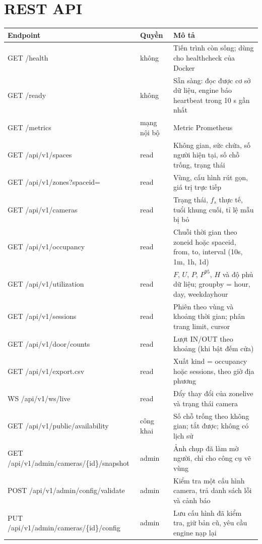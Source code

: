 \documentclass[10pt,a4paper,oneside,openany]{report}
\newcommand{\breakus}{\textunderscore\allowbreak}
\newcommand{\code}[1]{{\ttfamily\let\_\breakus #1}}
\newcommand{\tabhead}[1]{\textsf{\bfseries\color{ink}#1}}
\newenvironment{bang}{\par\small\rowcolors{2}{rowgray}{white}}{\par\vspace{0.3em}}
\begin{document}
\section{REST API}\label{sec:api}
\begin{bang}
\begin{xltabular}{\linewidth}{L{62mm}L{14mm}Y}
\toprule
\tabhead{Endpoint} & \tabhead{Quyền} & \tabhead{Mô tả} \\
\midrule
\endhead
\code{GET /health} & không & Tiến trình còn sống; dùng cho healthcheck của Docker \\
\code{GET /ready} & không & Sẵn sàng: đọc được cơ sở dữ liệu, engine báo heartbeat trong 10 s gần nhất \\
\code{GET /metrics} & mạng nội bộ & Metric Prometheus \\
\code{GET /api/v1/spaces} & read & Không gian, sức chứa, số người hiện tại, số chỗ trống, trạng thái \\
\code{GET /api/v1/zones?space\_id=} & read & Vùng, cấu hình rút gọn, giá trị trực tiếp \\
\code{GET /api/v1/cameras} & read & Trạng thái, $f_s$ thực tế, tuổi khung cuối, tỉ lệ mẫu bị bỏ \\
\code{GET /api/v1/occupancy} & read & Chuỗi thời gian theo \code{zone\_id} hoặc \code{space\_id}, \code{from}, \code{to}, \code{interval} (10s, 1m, 1h, 1d) \\
\code{GET /api/v1/utilization} & read & $F$, $U$, $P$, $P^{95}$, $H$ và độ phủ dữ liệu; \code{group\_by} = \code{hour}, \code{day}, \code{weekday\_hour} \\
\code{GET /api/v1/sessions} & read & Phiên theo vùng và khoảng thời gian; phân trang \code{limit}, \code{cursor} \\
\code{GET /api/v1/door/counts} & read & Lượt IN/OUT theo khoảng (khi bật đếm cửa) \\
\code{GET /api/v1/export.csv} & read & Xuất \code{kind} = \code{occupancy} hoặc \code{sessions}, theo giờ địa phương \\
\code{WS /api/v1/ws/live} & read & Đẩy thay đổi của \code{zone\_live} và trạng thái camera \\
\code{GET /api/v1/public/availability} & công khai & Số chỗ trống theo không gian; tắt được; không có lịch sử \\
\code{GET /api/v1/admin/cameras/\{id\}/snapshot} & admin & Ảnh chụp đã làm mờ người, chỉ cho công cụ vẽ vùng \\
\code{POST /api/v1/admin/config/validate} & admin & Kiểm tra một cấu hình camera, trả danh sách lỗi và cảnh báo \\
\code{PUT /api/v1/admin/cameras/\{id\}/config} & admin & Lưu cấu hình đã kiểm tra, giữ bản cũ, yêu cầu engine nạp lại \\
\bottomrule
\end{xltabular}
\end{bang}
\end{document}
